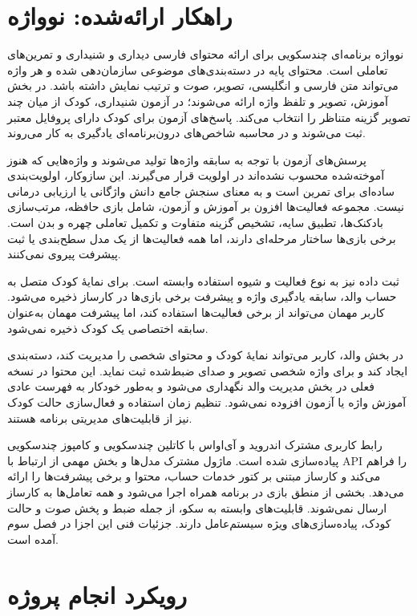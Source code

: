 \section{راهکار ارائه‌شده: نوواژه}

نوواژه برنامه‌ای چندسکویی برای ارائه محتوای فارسی دیداری و شنیداری و تمرین‌های تعاملی است. محتوای پایه در دسته‌بندی‌های موضوعی سازمان‌دهی شده و هر واژه می‌تواند متن فارسی و انگلیسی، تصویر، صوت و ترتیب نمایش داشته باشد. در بخش آموزش، تصویر و تلفظ واژه ارائه می‌شوند؛ در آزمون شنیداری، کودک از میان چند تصویر گزینه متناظر را انتخاب می‌کند. پاسخ‌های آزمون برای کودک دارای پروفایل معتبر ثبت می‌شوند و در محاسبه شاخص‌های درون‌برنامه‌ای یادگیری به کار می‌روند.

پرسش‌های آزمون با توجه به سابقه واژه‌ها تولید می‌شوند و واژه‌هایی که هنوز آموخته‌شده محسوب نشده‌اند در اولویت قرار می‌گیرند. این سازوکار، اولویت‌بندی ساده‌ای برای تمرین است و به معنای سنجش جامع دانش واژگانی یا ارزیابی درمانی نیست. مجموعه فعالیت‌ها افزون بر آموزش و آزمون، شامل بازی حافظه، مرتب‌سازی بادکنک‌ها، تطبیق سایه، تشخیص گزینه متفاوت و تکمیل تعاملی چهره و بدن است. برخی بازی‌ها ساختار مرحله‌ای دارند، اما همه فعالیت‌ها از یک مدل سطح‌بندی یا ثبت پیشرفت پیروی نمی‌کنند.

ثبت داده نیز به نوع فعالیت و شیوه استفاده وابسته است. برای نمایهٔ کودک متصل به حساب والد، سابقه یادگیری واژه و پیشرفت برخی بازی‌ها در کارساز ذخیره می‌شود. کاربر مهمان می‌تواند از برخی فعالیت‌ها استفاده کند، اما پیشرفت مهمان به‌عنوان سابقه اختصاصی یک کودک ذخیره نمی‌شود.

در بخش والد، کاربر می‌تواند نمایهٔ کودک و محتوای شخصی را مدیریت کند، دسته‌بندی ایجاد کند و برای واژه شخصی تصویر و صدای ضبط‌شده ثبت نماید. این محتوا در نسخه فعلی در بخش مدیریت والد نگهداری می‌شود و به‌طور خودکار به فهرست عادی آموزش واژه یا آزمون افزوده نمی‌شود. تنظیم زمان استفاده و فعال‌سازی حالت کودک نیز از قابلیت‌های مدیریتی برنامه هستند.

رابط کاربری مشترک اندروید و آی‌اواس با کاتلین چندسکویی و کامپوز چندسکویی پیاده‌سازی شده است. ماژول مشترک مدل‌ها و بخش مهمی از ارتباط با API را فراهم می‌کند و کارساز مبتنی بر کتور خدمات حساب، محتوا و برخی پیشرفت‌ها را ارائه می‌دهد. بخشی از منطق بازی در برنامه همراه اجرا می‌شود و همه تعامل‌ها به کارساز ارسال نمی‌شوند. قابلیت‌های وابسته به سکو، از جمله ضبط و پخش صوت و حالت کودک، پیاده‌سازی‌های ویژه سیستم‌عامل دارند. جزئیات فنی این اجزا در فصل سوم آمده است.

\section{رویکرد انجام پروژه}

